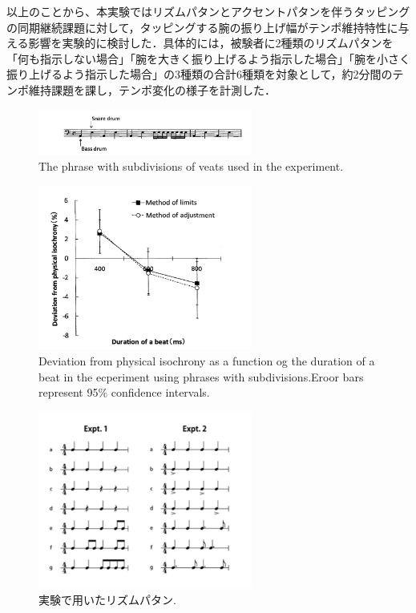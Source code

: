 \documentclass[twocolumn,10pt]{jarticle}
\begin{document}
以上のことから、本実験ではリズムパタンとアクセントパタンを伴うタッピングの同期継続課題に対して，タッピングする腕の振り上げ幅がテンポ維持特性に与える影響を実験的に検討した．具体的には，被験者に2種類のリズムパタンを「何も指示しない場合」「腕を大きく振り上げるよう指示した場合」「腕を小さく振り上げるよう指示した場合」の3種類の合計6種類を対象として，約2分間のテンポ維持課題を課し，テンポ変化の様子を計測した．
\begin{figure}
  \centering
  \includegraphics[width=7cm]{Arao_f1.jpg}
  \caption{The phrase with subdivisions of veats used in the experiment\cite{Arao}.}
  \label{Arao_f1}
\end{figure}
\begin{figure}
  \centering
  \includegraphics[width=7cm]{Arao_f2.jpg}
  \caption{Deviation from physical isochrony as a function og the duration of a beat in the ecperiment using phrases with subdivisions.Eroor bars represent 95\% confidence intervals\cite{Arao}.}
  \label{Arao_f2}
\end{figure}
\begin{figure}
  \centering
  \includegraphics[width=7cm]{Nagasima.jpg}
  \caption{実験で用いたリズムパタン\cite{Nagasima}.}
  \label{Nagasima}
\end{figure}
\end{document}
